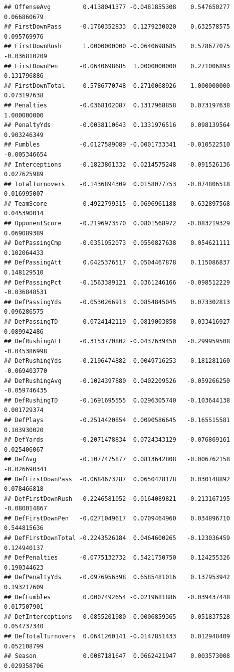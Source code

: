 \documentclass[
]{book}
\begin{document}
\begin{verbatim}
## OffenseAvg         0.4138041377 -0.0481855308    0.547650277  0.066860679
## FirstDownPass     -0.1760352833  0.1279230020    0.632578575  0.095769976
## FirstDownRush      1.0000000000 -0.0640698685    0.578677075 -0.036810209
## FirstDownPen      -0.0640698685  1.0000000000    0.271006893  0.131796886
## FirstDownTotal     0.5786770748  0.2710068926    1.000000000  0.073197638
## Penalties         -0.0368102087  0.1317968858    0.073197638  1.000000000
## PenaltyYds        -0.0038110643  0.1331976516    0.098139564  0.903246349
## Fumbles           -0.0127589089 -0.0001733341   -0.010522510 -0.005346654
## Interceptions     -0.1823861332  0.0214575248   -0.091526136  0.027625989
## TotalTurnovers    -0.1436894309  0.0158077753   -0.074806518  0.016995007
## TeamScore          0.4922799315  0.0696961188    0.632897568  0.045390014
## OpponentScore     -0.2196973570  0.0801568972   -0.083219329  0.069089389
## DefPassingCmp     -0.0351952073  0.0550827638    0.054621111  0.102064433
## DefPassingAtt      0.0425376517  0.0504467878    0.115086837  0.148129510
## DefPassingPct     -0.1563389121  0.0361246166   -0.098512229 -0.036848531
## DefPassingYds     -0.0530266913  0.0854845045    0.073302813  0.096286575
## DefPassingTD      -0.0724142119  0.0819003858    0.033416927  0.089942486
## DefRushingAtt     -0.3153770802 -0.0437639450   -0.299959508 -0.045386998
## DefRushingYds     -0.2196474882  0.0049716253   -0.181281160 -0.069403770
## DefRushingAvg     -0.1024397880  0.0402209526   -0.059266250 -0.059746435
## DefRushingTD      -0.1691695555  0.0296305740   -0.103644138  0.001729374
## DefPlays          -0.2514420854  0.0090586645   -0.165515581  0.103930020
## DefYards          -0.2071478834  0.0724343129   -0.076869161  0.025406067
## DefAvg            -0.1077475877  0.0813642808   -0.006762158 -0.026690341
## DefFirstDownPass  -0.0684673287  0.0650428178    0.030148892  0.078466818
## DefFirstDownRush  -0.2246581052 -0.0164089821   -0.213167195 -0.080014867
## DefFirstDownPen   -0.0271049617  0.0709464960    0.034896710  0.544815636
## DefFirstDownTotal -0.2243526184  0.0464600265   -0.123036459  0.124940137
## DefPenalties      -0.0775132732  0.5421750750    0.124255326  0.190344623
## DefPenaltyYds     -0.0976956398  0.6585481016    0.137953942  0.193217609
## DefFumbles         0.0007492654 -0.0219681886   -0.039437448  0.017507901
## DefInterceptions   0.0855201980 -0.0006859365    0.051837528  0.054737340
## DefTotalTurnovers  0.0641260141 -0.0147851433    0.012948409  0.052108799
## Season             0.0087181647  0.0662421947    0.003573008  0.029358706

\end{verbatim}
\end{document}
